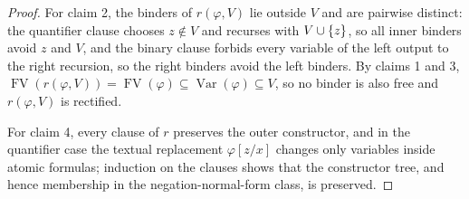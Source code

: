 \documentclass[11pt,oneside,openany]{book}
\theoremstyle{definition}
\theoremstyle{plain}
\theoremstyle{remark}
\DeclarePairedDelimiter{\set}{\lbrace}{\rbrace}
\newcommand{\FV}{\operatorname{FV}}
\begin{document}
\begin{proof}
For claim 2, the binders of \(r(\varphi,V)\) lie outside \(V\) and are
pairwise distinct: the quantifier clause chooses \(z\notin V\) and
recurses with \(V\cup\set{z}\), so all inner binders avoid \(z\) and
\(V\), and the binary clause forbids every variable of the left output to
the right recursion, so the right binders avoid the left binders.  By
claims 1 and 3, \(\FV(r(\varphi,V))=\FV(\varphi)\subseteq
\operatorname{Var}(\varphi)\subseteq V\), so no binder is also free and
\(r(\varphi,V)\) is rectified.

For claim 4, every clause of \(r\) preserves the outer constructor, and
in the quantifier case the textual replacement \(\varphi[z/x]\) changes
only variables inside atomic formulas; induction on the clauses shows
that the constructor tree, and hence membership in the
negation-normal-form class, is preserved.
\end{proof}
\end{document}
